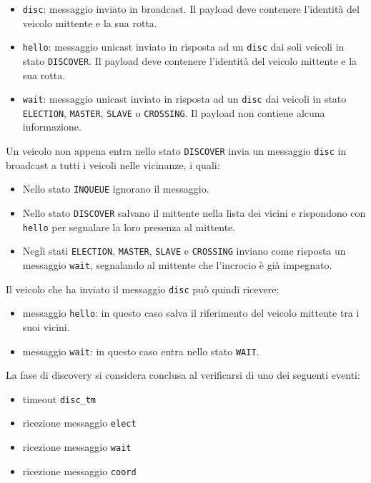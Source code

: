 \documentclass{memoir}
\begin{document}
\begin{itemize}
\item \texttt{disc}: messaggio inviato in broadcast. Il payload deve contenere
  l'identità del veicolo mittente e la sua rotta.
\item \texttt{hello}: messaggio unicast inviato in risposta ad un \texttt{disc}
  dai soli veicoli in stato \texttt{DISCOVER}. Il payload deve contenere
  l'identità del veicolo mittente e la sua rotta.
\item \texttt{wait}: messaggio unicast inviato in risposta ad un \texttt{disc}
  dai veicoli in stato \texttt{ELECTION}, \texttt{MASTER}, \texttt{SLAVE} o
  \texttt{CROSSING}. Il payload non contiene alcuna informazione.
\end{itemize} 

Un veicolo non appena entra nello stato \texttt{DISCOVER} invia un messaggio
\texttt{disc} in broadcast a tutti i veicoli nelle vicinanze, i quali:
\begin{itemize}
\item Nello stato \texttt{INQUEUE} ignorano il messaggio.
\item Nello stato \texttt{DISCOVER} salvano il mittente nella lista dei vicini e
  rispondono con \texttt{hello} per segnalare la loro presenza al mittente.
\item Negli stati \texttt{ELECTION}, \texttt{MASTER}, \texttt{SLAVE} e
  \texttt{CROSSING} inviano come risposta un messaggio \texttt{wait}, segnalando
  al mittente che l'incrocio è già impegnato.
\end{itemize}

Il veicolo che ha inviato il messaggio \texttt{disc} può quindi ricevere:
\begin{itemize}
\item messaggio \texttt{hello}: in questo caso salva il riferimento del veicolo
  mittente tra i suoi vicini.
\item messaggio \texttt{wait}: in questo caso entra nello stato \texttt{WAIT}.
\end{itemize}

La fase di discovery si considera conclusa al verificarsi di uno dei seguenti
eventi:
\begin{itemize}
\item timeout \texttt{disc\_tm}
\item ricezione messaggio \texttt{elect}
\item ricezione messaggio \texttt{wait}
\item ricezione messaggio \texttt{coord}
\end{itemize}
\end{document}
